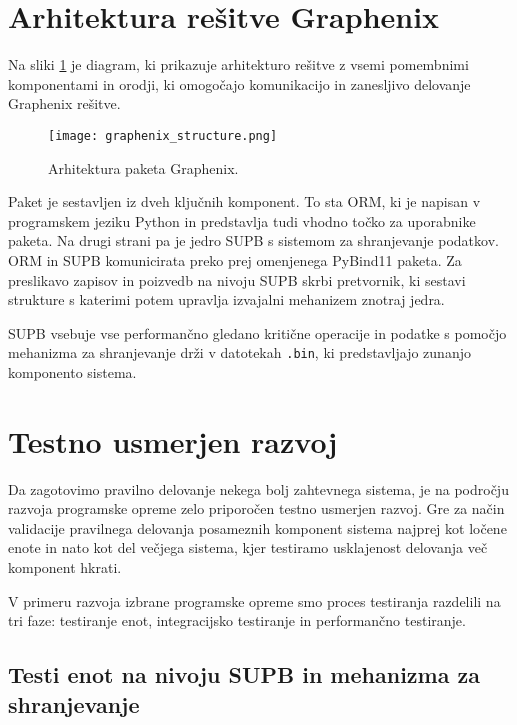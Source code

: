 \documentclass[a4paper,12pt,openright]{book}
\begin{document}
    \section{Arhitektura rešitve Graphenix}
    \label{graphenix_final}

    Na sliki \ref{graphenix_structure} je diagram, ki prikazuje arhitekturo rešitve z vsemi pomembnimi komponentami in orodji, ki omogočajo komunikacijo in zanesljivo delovanje Graphenix rešitve.
    
    \begin{figure}[H]
            \centerline{\texttt{[image: graphenix\_structure.png]}}
            \caption{Arhitektura paketa Graphenix.}
        \label{graphenix_structure}
    \end{figure}

    \noindent
    Paket je sestavljen iz dveh ključnih komponent. To sta ORM, ki je napisan v programskem jeziku Python in predstavlja tudi vhodno točko za uporabnike paketa. Na drugi strani pa je jedro SUPB s sistemom za shranjevanje podatkov. ORM in SUPB komunicirata preko prej omenjenega PyBind11 \cite{PYBIND11_GITHUB} paketa. Za preslikavo zapisov in poizvedb na nivoju SUPB skrbi pretvornik, ki sestavi strukture s katerimi potem upravlja izvajalni mehanizem znotraj jedra.

    SUPB vsebuje vse performančno gledano kritične operacije in podatke s pomočjo mehanizma za shranjevanje drži v datotekah {\tt .bin}, ki predstavljajo zunanjo komponento sistema.
    
    \section{Testno usmerjen razvoj}

    Da zagotovimo pravilno delovanje nekega bolj zahtevnega sistema, je na področju razvoja programske opreme zelo priporočen testno usmerjen razvoj. Gre za način validacije pravilnega delovanja posameznih komponent sistema najprej kot ločene enote in nato kot del večjega sistema, kjer testiramo usklajenost delovanja več komponent hkrati.
    
    V primeru razvoja izbrane programske opreme smo proces testiranja razdelili na tri faze: testiranje enot, integracijsko testiranje in performančno testiranje.
   
   \subsection{Testi enot na nivoju SUPB in mehanizma za shranjevanje}
\end{document}
